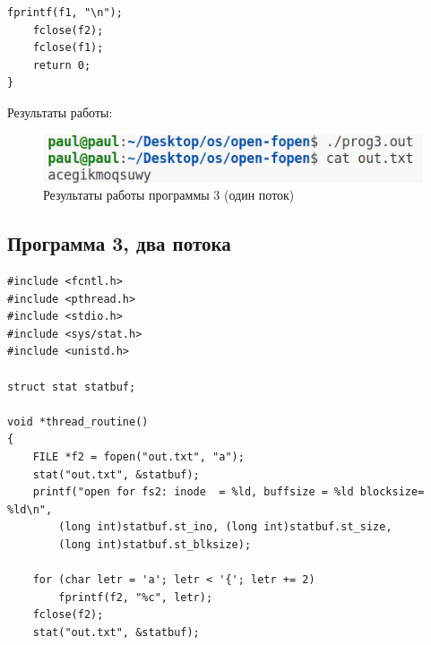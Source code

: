 \clearpage

\begin{center}
	\captionsetup{justification=raggedright,singlelinecheck=off}

	\begin{lstlisting}[label=lst:prog3-2,caption=Программа 3 --- один поток --- часть 2]
    fprintf(f1, "\n");
    fclose(f2);
    fclose(f1);
    return 0;
}
	\end{lstlisting}
\end{center}

Результаты работы:

\begin{figure}[h]
	\centering
	\captionsetup{justification=centering}
	\includegraphics[width=150mm]{img/prog3.png}
	\caption{Результаты работы программы 3 (один поток)}
	\label{fig:prog-3-result}
\end{figure}

\subsection*{Программа 3, два потока}

\begin{center}
	\captionsetup{justification=raggedright,singlelinecheck=off}

	\begin{lstlisting}[label=lst:prog3-th-1,caption=Программа 3 --- два потока --- часть 1]
#include <fcntl.h>
#include <pthread.h>
#include <stdio.h>
#include <sys/stat.h>
#include <unistd.h>

struct stat statbuf;

void *thread_routine() 
{
    FILE *f2 = fopen("out.txt", "a");
    stat("out.txt", &statbuf);
    printf("open for fs2: inode  = %ld, buffsize = %ld blocksize= %ld\n",
        (long int)statbuf.st_ino, (long int)statbuf.st_size,
        (long int)statbuf.st_blksize);

    for (char letr = 'a'; letr < '{'; letr += 2) 
        fprintf(f2, "%c", letr);
    fclose(f2);
    stat("out.txt", &statbuf);
	\end{lstlisting}
\end{center}

\clearpage

